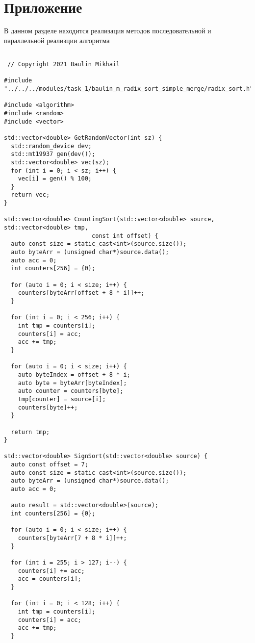 \documentclass{report}
\begin{document}
    \section*{Приложение}
    В данном разделе находится реализация методов последовательной и параллельной реализции алгоритма
    \begin{lstlisting}

 // Copyright 2021 Baulin Mikhail

#include "../../../modules/task_1/baulin_m_radix_sort_simple_merge/radix_sort.h"

#include <algorithm>
#include <random>
#include <vector>

std::vector<double> GetRandomVector(int sz) {
  std::random_device dev;
  std::mt19937 gen(dev());
  std::vector<double> vec(sz);
  for (int i = 0; i < sz; i++) {
    vec[i] = gen() % 100;
  }
  return vec;
}

std::vector<double> CountingSort(std::vector<double> source, std::vector<double> tmp,
                         const int offset) {
  auto const size = static_cast<int>(source.size());
  auto byteArr = (unsigned char*)source.data();
  auto acc = 0;
  int counters[256] = {0};

  for (auto i = 0; i < size; i++) {
    counters[byteArr[offset + 8 * i]]++;
  }

  for (int i = 0; i < 256; i++) {
    int tmp = counters[i];
    counters[i] = acc;
    acc += tmp;
  }

  for (auto i = 0; i < size; i++) {
    auto byteIndex = offset + 8 * i;
    auto byte = byteArr[byteIndex];
    auto counter = counters[byte];
    tmp[counter] = source[i];
    counters[byte]++;
  }

  return tmp;
}

std::vector<double> SignSort(std::vector<double> source) {
  auto const offset = 7;
  auto const size = static_cast<int>(source.size());
  auto byteArr = (unsigned char*)source.data();
  auto acc = 0;

  auto result = std::vector<double>(source);
  int counters[256] = {0};

  for (auto i = 0; i < size; i++) {
    counters[byteArr[7 + 8 * i]]++;
  }

  for (int i = 255; i > 127; i--) {
    counters[i] += acc;
    acc = counters[i];
  }

  for (int i = 0; i < 128; i++) {
    int tmp = counters[i];
    counters[i] = acc;
    acc += tmp;
  }


\end{lstlisting}
\end{document}
